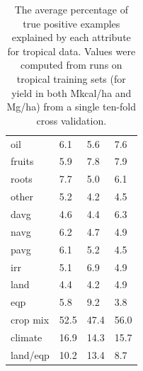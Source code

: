 \documentclass[12pt,twoside]{article}
\begin{document}
\begin{table}[h!]
{\begin{tabular}{llll}
oil & 6.1 & 5.6 & 7.6 \\
fruits & 5.9 & 7.8 & 7.9 \\
roots & 7.7 & 5.0 & 6.1 \\
other & 5.2 & 4.2 & 4.5 \\
davg & 4.6 & 4.4 & 6.3 \\
navg & 6.2 & 4.7 & 4.9 \\
pavg & 6.1 & 5.2 & 4.5 \\
irr & 5.1 & 6.9 & 4.9 \\
land & 4.4 & 4.2 & 4.9 \\
eqp & 5.8 & 9.2 & 3.8 \\
\midrule
crop mix & 52.5 & 47.4 & 56.0 \\
climate & 16.9 & 14.3 & 15.7 \\
land/eqp & 10.2 & 13.4 & 8.7 \\
\bottomrule
\end{tabular}
\label{t.ny.wt_percentages}
}
\captionsetup{width=.9\textwidth}
\caption[Percentage of Examples Explained by Attribute (Global Data)]{The average percentage of true positive examples explained by each attribute for tropical data. Values were computed from runs on tropical training sets (for yield in both Mkcal/ha and Mg/ha) from a single ten-fold cross validation.}
\label{global_percentages}
\end{table}
\end{document}
